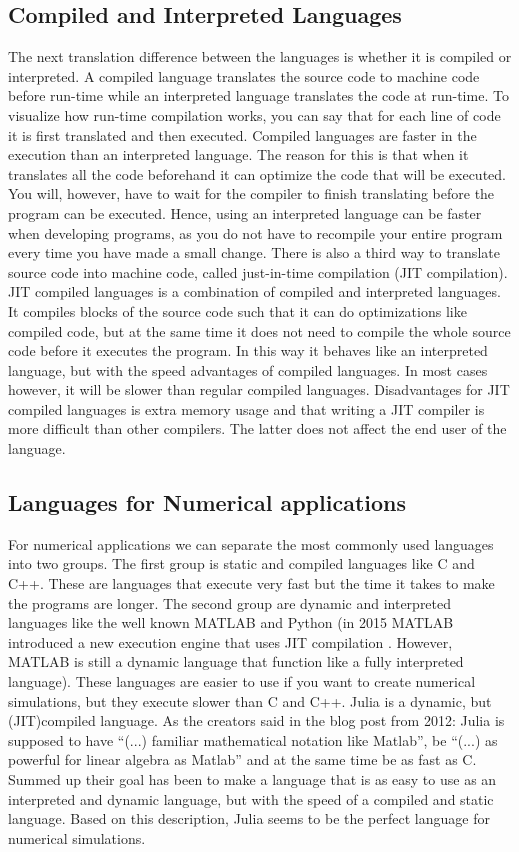 \subsection{Compiled and Interpreted Languages}
The next translation difference between the languages is whether it is compiled or interpreted. A compiled language translates the source code to machine code before run-time while an interpreted language translates the code at run-time. To visualize how run-time compilation works, you can say that for each line of code it is first translated and then executed. Compiled languages are faster in the execution than an interpreted language. The reason for this is that when it translates all the code beforehand it can optimize the code that will be executed. You will, however, have to wait for the compiler to finish translating before the program can be executed. Hence, using an interpreted language can be faster when developing programs, as you do not have to recompile your entire program every time you have made a small change. There is also a third way to translate source code into machine code, called just-in-time compilation (JIT compilation). JIT compiled languages is a combination of compiled and interpreted languages. It compiles blocks of the source code such that it can do optimizations like compiled code, but at the same time it does not need to compile the whole source code before it executes the program. In this way it behaves like an interpreted language, but with the speed advantages of compiled languages. In most cases however, it will be slower than regular compiled languages. Disadvantages for JIT compiled languages is extra memory usage and that writing a JIT compiler is more difficult than other compilers. The latter does not affect the end user of the language.

\subsection{Languages for Numerical applications}
\label{sec:numericalLang}
For numerical applications we can separate the most commonly used languages into two groups. The first group is static and compiled languages like C and C++. These are languages that execute very fast but the time it takes to make the programs are longer. The second group are dynamic and interpreted languages like the well known MATLAB and Python (in 2015 MATLAB introduced a new execution engine that uses JIT compilation \emph{\citep{MatlabJIT}}. However, MATLAB is still a dynamic language that function like a fully interpreted language). These languages are easier to use if you want to create numerical simulations, but they execute slower than C and C++. Julia is a dynamic, but (JIT)compiled language. As the creators said in the blog post from 2012: Julia is supposed to have \enquote{(...) familiar mathematical notation like Matlab}, be \enquote{(...) as  powerful  for  linear  algebra  as Matlab} and at the same time be as fast as C. Summed up their goal has been to make a language that is as easy to use as an interpreted and dynamic language, but with the speed of a compiled and static language. Based on this description, Julia seems to be the perfect language for numerical simulations.

